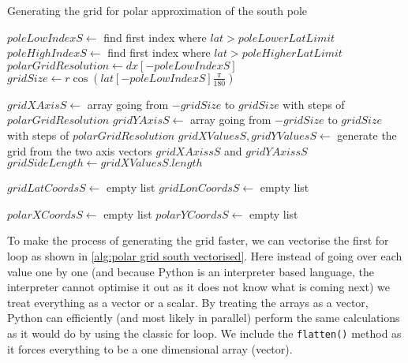 \begin{algorithm}[htb]
    \caption{Generating the grid for polar approximation of the south pole}
    \label{alg:polar grid south}
    $poleLowIndexS \leftarrow $ find first index where $lat > poleLowerLatLimit$ \;
    $poleHighIndexS \leftarrow $ find first index where $lat > poleHigherLatLimit$ \;
    $polarGridResolution \leftarrow dx[-poleLowIndexS] $ 
    $gridSize \leftarrow r \cos(lat[-poleLowIndexS] \frac{\pi}{180})$ 
    \BlankLine

    $gridXAxisS \leftarrow $ array going from $-gridSize$ to $gridSize$ with steps of $polarGridResolution$ \;
    $gridYAxisS \leftarrow $ array going from $-gridSize$ to $gridSize$ with steps of $polarGridResolution$ \;
    $gridXValuesS, gridYValuesS \leftarrow $ generate the grid from the two axis vectors $gridXAxissS$ and $gridYAxissS$ \;
    $gridSideLength \leftarrow gridXValuesS.length $ 
    \BlankLine 

    $gridLatCoordsS \leftarrow $ empty list \;
    $gridLonCoordsS \leftarrow $ empty list \;

    \BlankLine
    $polarXCoordsS \leftarrow$ empty list \;
    $polarYCoordsS \leftarrow$ empty list \;
\end{algorithm}

To make the process of generating the grid faster, we can vectorise the first for loop as shown in \autoref{alg:polar grid south vectorised}. Here instead of going over each value one by one 
(and because Python is an interpreter based language, the interpreter cannot optimise it out as it does not know what is coming next) we treat everything as a vector or a scalar. By treating the 
arrays as a vector, Python can efficiently (and most likely in parallel) perform the same calculations as it would do by using the classic for loop. We include the \texttt{flatten()} method as 
it forces everything to be a one dimensional array (vector).


